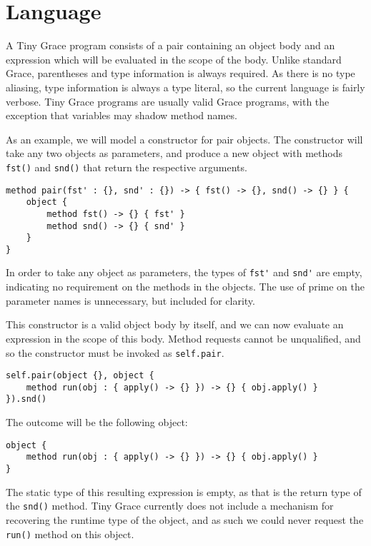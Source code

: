 \section{Language}

A Tiny Grace program consists of a pair containing an object body and an
expression which will be evaluated in the scope of the body. Unlike standard
Grace, parentheses and type information is always required.  As there is no type
aliasing, type information is always a type literal, so the current language is
fairly verbose.  Tiny Grace programs are usually valid Grace programs, with
the exception that variables may shadow method names.

As an example, we will model a constructor for pair objects.  The constructor
will take any two objects as parameters, and produce a new object with methods
\lstinline{fst()} and \lstinline{snd()} that return the respective arguments.

\begin{lstlisting}
method pair(fst' : {}, snd' : {}) -> { fst() -> {}, snd() -> {} } {
    object {
        method fst() -> {} { fst' }
        method snd() -> {} { snd' }
    }
}
\end{lstlisting}

\noindent In order to take any object as parameters, the types of
\lstinline{fst'} and \lstinline{snd'} are empty, indicating no requirement on
the methods in the objects.  The use of prime on the parameter names is
unnecessary, but included for clarity.

This constructor is a valid object body by itself, and we can now evaluate an
expression in the scope of this body.  Method requests cannot be unqualified,
and so the constructor must be invoked as \lstinline{self.pair}.

\begin{lstlisting}
self.pair(object {}, object {
    method run(obj : { apply() -> {} }) -> {} { obj.apply() }
}).snd()
\end{lstlisting}

\noindent The outcome will be the following object:

\begin{lstlisting}
object {
    method run(obj : { apply() -> {} }) -> {} { obj.apply() }
}
\end{lstlisting}

\noindent The static type of this resulting expression is empty, as that is
the return type of the \lstinline{snd()} method.  Tiny Grace currently does
not include a mechanism for recovering the runtime type of the object, and as
such we could never request the \lstinline{run()} method on this object.


